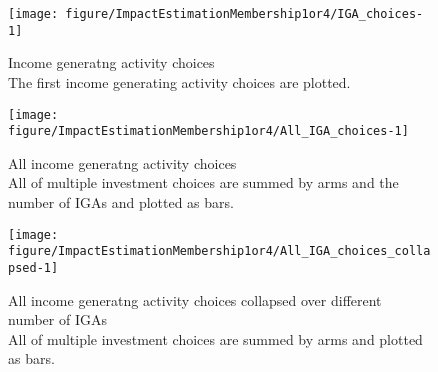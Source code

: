 \begin{Schunk}
\begin{figure}

{\centering \texttt{[image: figure/ImpactEstimationMembership1or4/IGA\_choices-1]} 

}

\caption{Income generatng activity choices\\ {\footnotesize The first income generating activity choices are plotted.\setlength{\baselineskip}{8pt}}}\label{Figure IGA choices}
\end{figure}
\end{Schunk}
\begin{Schunk}
\begin{figure}

{\centering \texttt{[image: figure/ImpactEstimationMembership1or4/All\_IGA\_choices-1]} 

}

\caption{All income generatng activity choices\\ {\footnotesize All of multiple investment choices are summed by arms and the number of IGAs and plotted as bars. \setlength{\baselineskip}{8pt}}}\label{Figure All IGA choices}
\end{figure}
\end{Schunk}
\begin{Schunk}
\begin{figure}

{\centering \texttt{[image: figure/ImpactEstimationMembership1or4/All\_IGA\_choices\_collapsed-1]} 

}

\caption{All income generatng activity choices collapsed over different number of IGAs\\ {\footnotesize All of multiple investment choices are summed by arms and plotted as bars. \setlength{\baselineskip}{8pt}}}\label{Figure All IGA choices collapsed}
\end{figure}
\end{Schunk}

